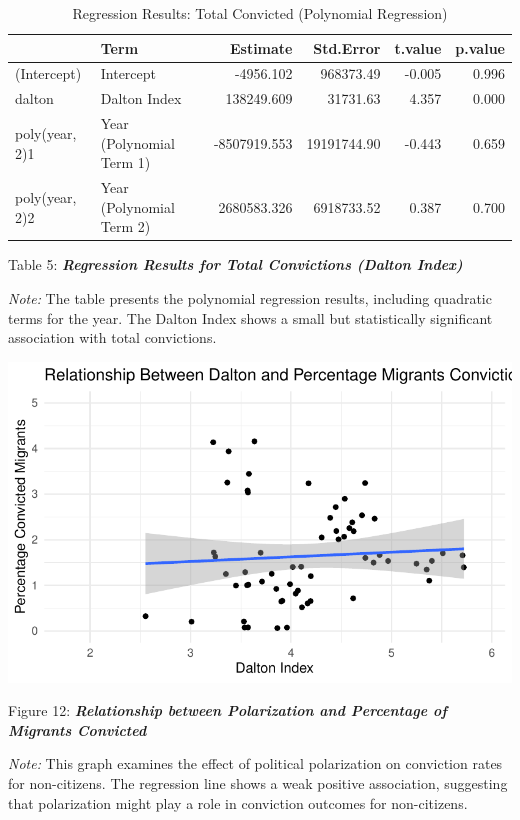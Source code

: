 \documentclass[
]{article}
\begin{document}
\begin{table}
\centering
\caption{Regression Results: Total Convicted (Polynomial Regression)}
\centering
\begin{tabular}[t]{l|l|r|r|r|r}
\hline
  & Term & Estimate & Std.Error & t.value & p.value\\
\hline
(Intercept) & Intercept & -4956.102 & 968373.49 & -0.005 & 0.996\\
\hline
dalton & Dalton Index & 138249.609 & 31731.63 & 4.357 & 0.000\\
\hline
poly(year, 2)1 & Year (Polynomial Term 1) & -8507919.553 & 19191744.90 & -0.443 & 0.659\\
\hline
poly(year, 2)2 & Year (Polynomial Term 2) & 2680583.326 & 6918733.52 & 0.387 & 0.700\\
\hline
\end{tabular}
\end{table}

Table 5: \textbf{\emph{Regression Results for Total Convictions (Dalton
Index)}}

\emph{Note:} The table presents the polynomial regression results,
including quadratic terms for the year. The Dalton Index shows a small
but statistically significant association with total convictions.

\includegraphics{DataMan_Project_files/figure-pdf/unnamed-chunk-41-1.pdf}

Figure 12: \textbf{\emph{Relationship between Polarization and
Percentage of Migrants Convicted}}

\emph{Note:} This graph examines the effect of political polarization on
conviction rates for non-citizens. The regression line shows a weak
positive association, suggesting that polarization might play a role in
conviction outcomes for non-citizens.
\end{document}
